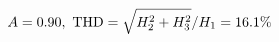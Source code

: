 \documentclass[preview]{standalone}
\begin{document}
\begin{align*}
\special{dvisvgm:raw <g id='unique000'>}A=0.90,\ \text{THD}=\sqrt{H_2^2+H_3^2}/H_1=16.1\%\special{dvisvgm:raw </g>}
\end{align*}
\end{document}
